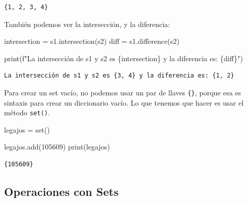 \documentclass[
  letterpaper,
  DIV=11,
  numbers=noendperiod]{scrreprt}
\newenvironment{Shaded}{\begin{snugshade}}{\end{snugshade}}
\newcommand{\BuiltInTok}[1]{\textcolor[rgb]{0.00,0.23,0.31}{#1}}
\newcommand{\DecValTok}[1]{\textcolor[rgb]{0.68,0.00,0.00}{#1}}
\newcommand{\NormalTok}[1]{\textcolor[rgb]{0.00,0.23,0.31}{#1}}
\newcommand{\OperatorTok}[1]{\textcolor[rgb]{0.37,0.37,0.37}{#1}}
\newcommand{\SpecialCharTok}[1]{\textcolor[rgb]{0.37,0.37,0.37}{#1}}
\newcommand{\SpecialStringTok}[1]{\textcolor[rgb]{0.13,0.47,0.30}{#1}}
\begin{document}
\begin{verbatim}
{1, 2, 3, 4}
\end{verbatim}

También podemos ver la intersección, y la diferencia:

\begin{Shaded}
\begin{Highlighting}[]
\NormalTok{intersection }\OperatorTok{=}\NormalTok{ s1.intersection(s2)}
\NormalTok{diff }\OperatorTok{=}\NormalTok{ s1.difference(s2)}

\BuiltInTok{print}\NormalTok{(}\SpecialStringTok{f"La intersección de s1 y s2 es }\SpecialCharTok{\{}\NormalTok{intersection}\SpecialCharTok{\}}\SpecialStringTok{ y la diferencia es: }\SpecialCharTok{\{}\NormalTok{diff}\SpecialCharTok{\}}\SpecialStringTok{"}\NormalTok{)}
\end{Highlighting}
\end{Shaded}

\begin{verbatim}
La intersección de s1 y s2 es {3, 4} y la diferencia es: {1, 2}
\end{verbatim}

Para crear un set vacío, no podemos usar un par de llaves \texttt{\{\}},
porque esa es sintaxis para crear un diccionario vacío. Lo que tenemos
que hacer es usar el método \texttt{set()}.

\begin{Shaded}
\begin{Highlighting}[]
\NormalTok{legajos }\OperatorTok{=} \BuiltInTok{set}\NormalTok{()}

\NormalTok{legajos.add(}\DecValTok{105609}\NormalTok{)}
\BuiltInTok{print}\NormalTok{(legajos)}
\end{Highlighting}
\end{Shaded}

\begin{verbatim}
{105609}
\end{verbatim}

\subsection{Operaciones con Sets}\label{operaciones-con-sets}
\end{document}
